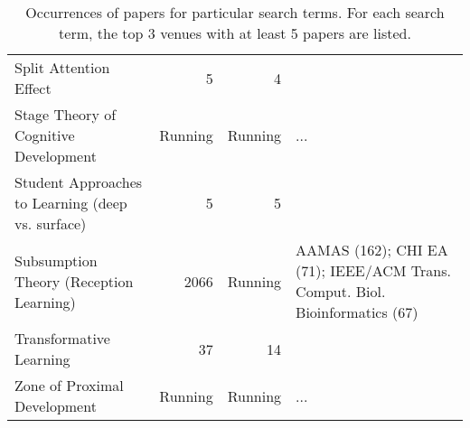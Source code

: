 \begin{table*}[t]
\begin{tabular}{lrrp{6cm}}
Split Attention Effect & 5 & 4 &  \\
Stage Theory of Cognitive Development & Running & Running & ... \\
Student Approaches to Learning (deep vs. surface) & 5 & 5 &  \\
Subsumption Theory (Reception Learning) & 2066 & Running & AAMAS  (162); CHI EA  (71); IEEE/ACM Trans. Comput. Biol. Bioinformatics (67) \\
Transformative Learning & 37 & 14 &  \\
Zone of Proximal Development & Running & Running & ... \\
\end{tabular}
\caption{Occurrences of papers for particular search terms. For each search term, the top 3 venues with at least 5 papers are listed.}
\end{table*}